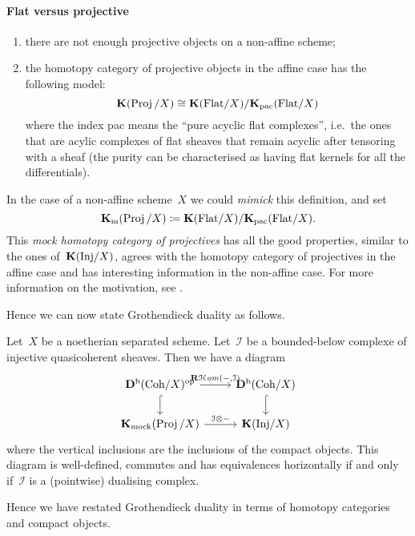 \paragraph{Flat versus projective}
\begin{enumerate}
  \item there are not enough projective objects on a non-affine scheme;
  \item the homotopy category of projective objects in the affine case has the following model:
    \begin{equation}
      \mathbf{K}(\operatorname{Proj}/X)\cong\mathbf{K}(\mathrm{Flat}/X)/\mathbf{K}_{\mathrm{pac}}(\mathrm{Flat}/X)
    \end{equation}
    where the index pac means the ``pure acyclic flat complexes'', i.e.\ the ones that are acylic complexes of flat sheaves that remain acyclic after tensoring with a sheaf (the purity can be characterised as having flat kernels for all the differentials).
\end{enumerate}
In the case of a non-affine scheme~$X$ we could \emph{mimick} this definition, and set
\begin{equation}
  \mathbf{K}_{\mathrm{m}}(\operatorname{Proj}/X)\coloneqq\mathbf{K}(\mathrm{Flat}/X)/\mathbf{K}_{\mathrm{pac}}(\mathrm{Flat}/X).
\end{equation}
This \emph{mock homotopy category of projectives} has all the good properties, similar to the ones of~$\mathbf{K}(\mathrm{Inj}/X)$, agrees with the homotopy category of projectives in the affine case and has interesting information in the non-affine case. For more information on the motivation, see \cite[chapter 1]{murfet-phd}.

Hence we can now state Grothendieck duality as follows.
\begin{theorem}
  Let~$X$ be a noetherian separated scheme. Let~$\mathcal{I}$ be a bounded-below complexe of injective quasicoherent sheaves. Then we have a diagram
  \begin{equation}
    \begin{tikzcd}
      \derived^\bounded(\Coh/X)^{\mathrm{op}} \arrow{r}{\RRRHHom(-,\mathcal{I})} \arrow[hook]{d} & \derived^\bounded(\Coh/X) \arrow[hook]{d} \\
      \KKK_{\mathrm{mock}}(\Proj/X) \arrow{r}{\mathcal{I}\otimes-} & \KKK(\Inj/X)
    \end{tikzcd}
  \end{equation}
  where the vertical inclusions are the inclusions of the compact objects. This diagram is well-defined, commutes and has equivalences horizontally if and only if~$\mathcal{I}$ is a (pointwise) dualising complex.
\end{theorem}
Hence we have restated Grothendieck duality in terms of homotopy categories and compact objects.


